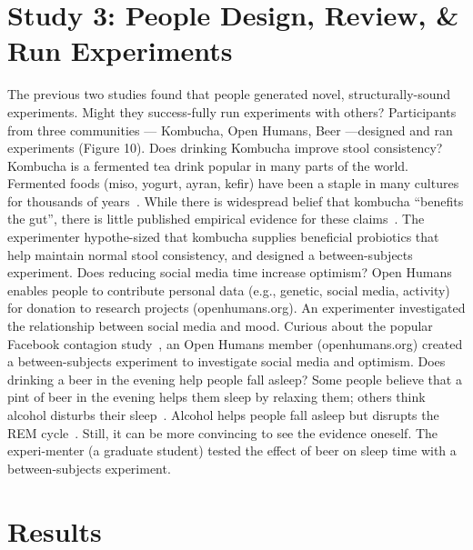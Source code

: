 \section{Study 3: People Design, Review, \& Run Experiments}
The previous two studies found that people generated novel, structurally-sound experiments. Might they success-fully run experiments with others? Participants from three communities — Kombucha, Open Humans, Beer —designed and ran experiments (Figure 10).  
Does drinking Kombucha improve stool consistency? Kombucha is a fermented tea drink popular in many parts of the world. Fermented foods (miso, yogurt, ayran, kefir) have been a staple in many cultures for thousands of years~\cite{Chilton2015}. While there is widespread belief that kombucha “benefits the gut”, there is little published empirical evidence for these claims~\cite{Ernst2003}. The experimenter hypothe-sized that kombucha supplies beneficial probiotics that help maintain normal stool consistency, and designed a between-subjects experiment.
Does reducing social media time increase optimism? Open Humans enables people to contribute personal data (e.g., genetic, social media, activity) for donation to research projects (openhumans.org). An experimenter investigated the relationship between social media and mood. Curious about the popular Facebook contagion study~\cite{Coviello2014}, an Open Humans member (openhumans.org) created a between-subjects experiment to investigate social media and optimism. 
Does drinking a beer in the evening help people fall asleep? Some people believe that a pint of beer in the evening helps them sleep by relaxing them; others think alcohol disturbs their sleep~\cite{Ph.D.}. Alcohol helps people fall asleep but disrupts the REM cycle~\cite{Ebrahim2013}. Still, it can be more convincing to see the evidence oneself. The experi-menter (a graduate student) tested the effect of beer on sleep time with a between-subjects experiment. 

\section{Results}
